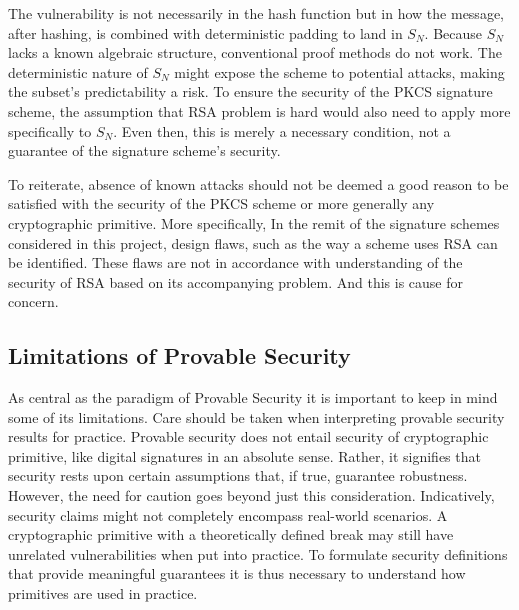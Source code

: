 \documentclass[]{final_report}
\theoremstyle{definition}
\begin{document}
The vulnerability is not necessarily in the hash function but in how the message, after hashing, is combined with deterministic padding to land in \( S_N \). Because \( S_N \) lacks a known algebraic structure, conventional proof methods do not work. The deterministic nature of \( S_N \) might expose the scheme to potential attacks, making the subset's predictability a risk. To ensure the security of the PKCS signature scheme, the assumption that RSA problem is hard would also need to apply more specifically to  $S_N$. Even then, this is merely a necessary condition, not a guarantee of the signature scheme's security. 

To reiterate, absence of known attacks should not be deemed a good reason to be satisfied with the security of the PKCS scheme or more generally any cryptographic primitive. More specifically, In the remit of the signature schemes considered in this project, design flaws, such as the way a scheme uses RSA can be identified. These flaws are not in accordance with understanding of the security of RSA based on its accompanying problem. And this is cause for concern.


\subsection{Limitations of Provable Security}
As central as the paradigm of Provable Security it is important to keep in mind some of its limitations. Care should be taken when interpreting provable security results for practice. Provable security does not entail security of cryptographic primitive, like digital signatures in an absolute sense. Rather, it signifies that security rests upon certain assumptions that, if true, guarantee robustness. 
However, the need for caution goes beyond just this consideration. Indicatively, security claims might not completely encompass real-world scenarios. A cryptographic primitive with a theoretically defined break may still have unrelated vulnerabilities when put into practice. To formulate security definitions that provide meaningful guarantees it is thus necessary to understand how primitives are used in practice.
\end{document}
